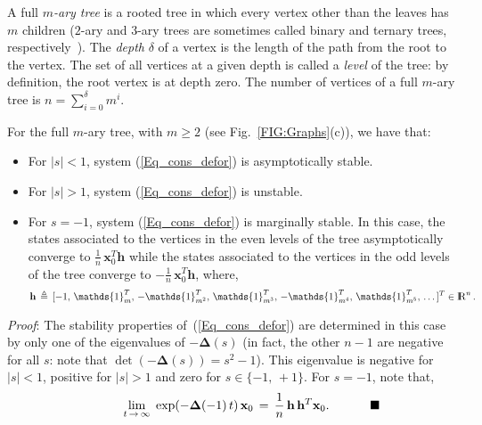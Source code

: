\documentclass[letterpaper,9pt,twocolumn]{autart}
\newcommand{\rr}{\mathop{{\rm I}\mskip-4.0mu{\rm R}}\nolimits}
\newcommand{\vet}[1]{\ensuremath{{\mathbf #1}}}
\begin{document}
A full \emph{$m$-ary tree} is a rooted tree in which every vertex other than the leaves
has $m$ children ($2$-ary and $3$-ary trees are sometimes called binary and ternary 
trees, respectively~\cite{GodsilRo_book01}).
The \emph{depth} $\delta$ of a vertex is the length of the path from the root
to the vertex. The set of all vertices at a given depth is called a \emph{level} of the tree:
by definition, the root vertex is at depth zero. The number of vertices of a full $m$-ary
tree is $n = \sum_{i=0}^{\delta} m^i$.\vspace{-0.12cm}
\begin{proposition}
For the full $m$-ary tree, with $m \geq 2$ (see Fig.~\ref{FIG:Graphs}(c)), we have that:
\begin{itemize}
\item For $|s| < 1$, system (\ref{Eq_cons_defor}) is asymptotically stable.
\item For $|s| > 1$, system (\ref{Eq_cons_defor}) is unstable.
\item For $s = -1$, system (\ref{Eq_cons_defor}) is marginally stable.
In this case, the states associated to the vertices in the even levels of the tree asymptotically converge to $\frac{1}{n}\,\vet{x}_0^T\vet{h}$
while the states associated to the vertices in the odd levels of the tree converge to $-\frac{1}{n}\,\vet{x}_0^T\vet{h}$, where, 
$$
\vet{h} \,\triangleq\, [-1,\,\mathds{1}^T_m,\,-\mathds{1}^T_{m^2},\,\mathds{1}^T_{m^3},\,
-\mathds{1}^T_{m^4},\,\mathds{1}^T_{m^5},\,\ldots\,]^T \in \rr^n.
$$
\end{itemize}
\emph{Proof}:
The stability properties of~(\ref{Eq_cons_defor}) are determined in this case by only
one of the eigenvalues of $-\boldsymbol{\Delta}(s)$ (in fact, the other $n-1$ are
negative for all $s$: note that $\det(-\boldsymbol{\Delta}(s)) = s^2-1$).
This eigenvalue is negative for $|s| < 1$, positive for $|s| > 1$ and
zero for $s \in \{-1,\,+1\}$. For $s = -1$, note that,
$$
\qquad\quad\;\lim_{t \,\rightarrow \,
  \infty}\;\exp(-\boldsymbol{\Delta}(-1)\,t)\,\vet{x}_0 \,=\,
\frac{1}{n}\,\vet{h}\,\vet{h}^T\vet{x}_0.\qquad\quad\; 
\hfill\blacksquare
$$
\end{proposition}
\end{document}
